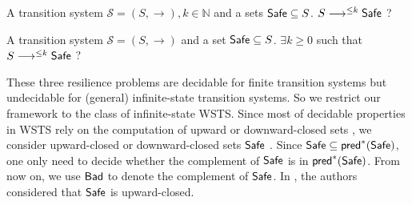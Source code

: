 {A transition system $\mathscr{S}=(S,\rightarrow), k \in \mathbb{N}$ and a sets $\textsf{Safe} \subseteq S$.}
{$S \longrightarrow^{\leq k} \textsf{Safe}$ ?\newline}

{A transition system $\mathscr{S}=(S,\rightarrow)$ and a set $\textsf{Safe} \subseteq S$.}
{$\exists k \geq 0$ such that {$S \longrightarrow^{\leq k} \textsf{Safe}$ ?\newline}}


  
These three resilience problems are decidable for finite transition systems but undecidable for (general) infinite-state transition systems. So we restrict our framework to the class of infinite-state WSTS. Since most of decidable properties in WSTS rely on the computation of upward or downward-closed sets \cite{DBLP:journals/iandc/AbdullaCJT00,DBLP:journals/tcs/FinkelS01}, we consider upward-closed or downward-closed sets $\textsf{Safe}$%
. Since $\textsf{Safe} \subseteq \textsf{pred}^*(\textsf{Safe})$, one only need to decide whether 
the complement of $\textsf{Safe}$ is in $\textsf{pred}^*(\textsf{Safe})$. From now on, we use $\textsf{Bad}$ to denote the complement of $\textsf{Safe}$.
In \cite{DBLP:journals/corr/abs-2108-00889}, the authors considered that $\textsf{Safe}$ is upward-closed. %

 



